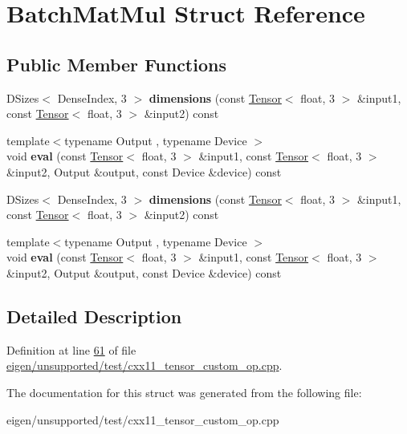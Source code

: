 \hypertarget{struct_batch_mat_mul}{}\section{Batch\+Mat\+Mul Struct Reference}
\label{struct_batch_mat_mul}
\subsection*{Public Member Functions}
\begin{DoxyCompactItemize}
\item 
\mbox{\label{struct_batch_mat_mul_ae1b97afeba6577ccc248f57b26023639}} 
D\+Sizes$<$ Dense\+Index, 3 $>$ {\bfseries dimensions} (const \hyperlink{class_eigen_1_1_tensor}{Tensor}$<$ float, 3 $>$ \&input1, const \hyperlink{class_eigen_1_1_tensor}{Tensor}$<$ float, 3 $>$ \&input2) const
\item 
\mbox{\label{struct_batch_mat_mul_a6329ecb9cbb8f7c6322cb8852abb2192}} 
{\footnotesize template$<$typename Output , typename Device $>$ }\\void {\bfseries eval} (const \hyperlink{class_eigen_1_1_tensor}{Tensor}$<$ float, 3 $>$ \&input1, const \hyperlink{class_eigen_1_1_tensor}{Tensor}$<$ float, 3 $>$ \&input2, Output \&output, const Device \&device) const
\item 
\mbox{\label{struct_batch_mat_mul_ae1b97afeba6577ccc248f57b26023639}} 
D\+Sizes$<$ Dense\+Index, 3 $>$ {\bfseries dimensions} (const \hyperlink{class_eigen_1_1_tensor}{Tensor}$<$ float, 3 $>$ \&input1, const \hyperlink{class_eigen_1_1_tensor}{Tensor}$<$ float, 3 $>$ \&input2) const
\item 
\mbox{\label{struct_batch_mat_mul_a6329ecb9cbb8f7c6322cb8852abb2192}} 
{\footnotesize template$<$typename Output , typename Device $>$ }\\void {\bfseries eval} (const \hyperlink{class_eigen_1_1_tensor}{Tensor}$<$ float, 3 $>$ \&input1, const \hyperlink{class_eigen_1_1_tensor}{Tensor}$<$ float, 3 $>$ \&input2, Output \&output, const Device \&device) const
\end{DoxyCompactItemize}


\subsection{Detailed Description}


Definition at line \hyperlink{eigen_2unsupported_2test_2cxx11__tensor__custom__op_8cpp_source_l00061}{61} of file \hyperlink{eigen_2unsupported_2test_2cxx11__tensor__custom__op_8cpp_source}{eigen/unsupported/test/cxx11\+\_\+tensor\+\_\+custom\+\_\+op.\+cpp}.



The documentation for this struct was generated from the following file\+:\begin{DoxyCompactItemize}
\item 
eigen/unsupported/test/cxx11\+\_\+tensor\+\_\+custom\+\_\+op.\+cpp\end{DoxyCompactItemize}
